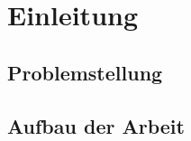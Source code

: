 \chapter{Einleitung}\label{ch:intro}

\section{Problemstellung}\label{sec:problem}

\section{Aufbau der Arbeit}\label{sec:structure}
